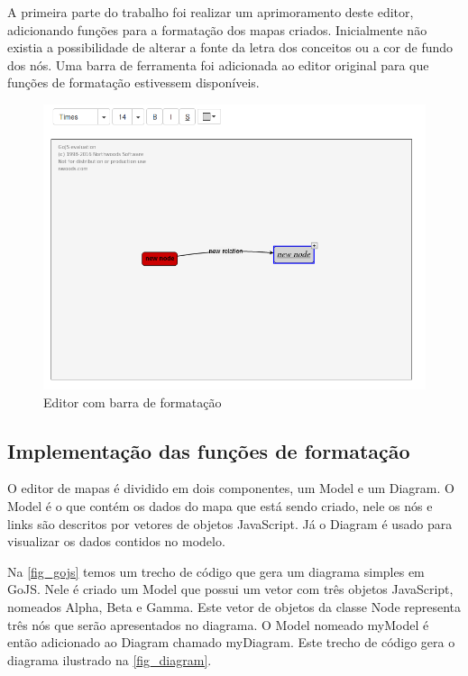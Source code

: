 \documentclass[
	12pt,				%
	openright,			%
	oneside,			%
	a4paper,			%
	english,			%
	french,				%
	spanish,			%
	brazil				%
	]{abntex2}
\begin{document}
A primeira parte do trabalho foi realizar um aprimoramento deste editor, adicionando funções para a formatação dos mapas criados. Inicialmente não existia a possibilidade de alterar a fonte da letra dos conceitos ou a cor de fundo dos nós. Uma barra de ferramenta foi adicionada ao editor original para que funções de formatação estivessem disponíveis.

\begin{figure}[htb]
	\caption{\label{fig_barraformacao} Editor com barra de formatação}
	\begin{center}
		\includegraphics[scale=0.5]{barraformacao.png}
	\end{center}
\end{figure}

\subsection{Implementação das funções de formatação}
O editor de mapas é dividido em dois componentes, um Model e um Diagram. O Model é o que contém os dados do mapa que está sendo criado, nele os nós e links são descritos por vetores de objetos JavaScript. Já o Diagram é usado para visualizar os dados contidos no modelo.

Na \autoref{fig_gojs} temos um trecho de código que gera um diagrama simples em GoJS. Nele é criado um Model que possui um vetor com três objetos JavaScript, nomeados Alpha, Beta e Gamma. Este vetor de objetos da classe Node representa três nós que serão apresentados no diagrama. O Model nomeado myModel é então adicionado ao Diagram chamado myDiagram. Este trecho de código gera o diagrama ilustrado na \autoref{fig_diagram}.
\end{document}
